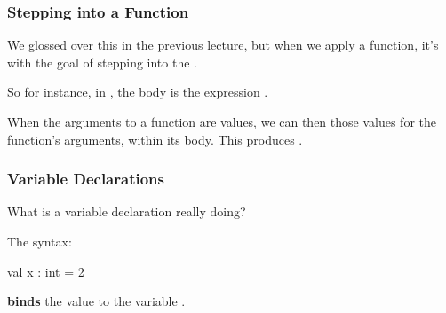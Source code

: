 \documentclass[aspectratio=169, handout]{beamer}
\begin{document}
\begin{frame}[fragile]
  \frametitle{Stepping into a Function}

  We glossed over this in the previous lecture, but when we
  apply a function, it's with the goal of stepping into the
  .

  \pause
  \vspace{\fill}


  \vspace{\fill}

  So for instance, in , the
  body is the expression .

  \pause
  \vspace{\fill}

  When the arguments to a function are values, we can then
   those values for the function's arguments,
  within its body. This produces .
\end{frame}


\begin{frame}[fragile]
  \frametitle{Variable Declarations}

  What is a variable declaration really doing?

  \pause
  \vspace{\fill}

  The syntax:

  \begin{codeblock}
    val x : int = 2
  \end{codeblock}

  \textbf{binds} the value  to the variable .

  \pause
  \vspace{\fill}


  \pause
  \vspace{\fill}

\end{frame}
\end{document}
